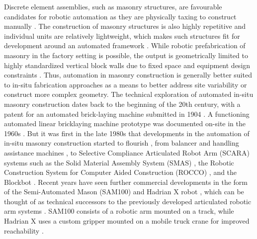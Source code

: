 Discrete element assemblies, such as masonry structures, are favourable candidates for robotic automation as they are physically taxing to construct manually \cite{vink_physical_2002, hess_ergonomic_2010}. The construction of masonry structures is also highly repetitive and individual units are relatively lightweight, which makes such structures fit for development around an automated framework \cite{dakhli_robotic_2017}. While robotic prefabrication of masonry in the factory setting is possible, the output is geometrically limited to highly standardized vertical block walls due to fixed space and equipment design constraints \cite{bock_robotic_2015}. Thus, automation in masonry construction is generally better suited to in-situ fabrication approaches as a means to better address site variability or construct more complex geometry. The technical exploration of automated in-situ masonry construction dates back to the beginning of the 20th century, with a patent for an automated brick-laying machine submitted in 1904 \cite{thomson_brick-laying_1904}. A functioning automated linear bricklaying machine prototype was documented on-site in the 1960s \cite{british_pathe_mechanical_1967}. But it was first in the late 1980s that developments in the automation of in-situ masonry construction started to flourish \cite{malinovsky_robotic_1990, chamberlain_progress_1991, altobelli_prototype_1993}, from balancer and handling assistance machines \cite{bock_robotic_2015}, to Selective Compliance Articulated Robot Arm (SCARA) systems such as the Solid Material Assembly System (SMAS) \cite{bock_early_2009, kodama_robotized_1988}, the Robotic Construction System for Computer Aided Construction (ROCCO) \cite{bock_robot-oriented_2015, andres_first_1994}, and the Blockbot \cite{slocum_blockbot_1988, lehtinen_outlines_1989}. Recent years have seen further commercial developments in the form of the Semi-Automated Mason (SAM100) \cite{podkaminer_sam100_2021} and Hadrian X robot \cite{pivac_hadrian_2021}, which can be thought of as technical successors to the previously developed articulated robotic arm systems \cite{pritschow_mobile_1994, pritschow_technological_1996}. SAM100 consists of a robotic arm mounted on a track, while Hadrian X uses a custom gripper mounted on a mobile truck crane for improved reachability \cite{dakhli_robotic_2017, sklar_robots_2015}.


